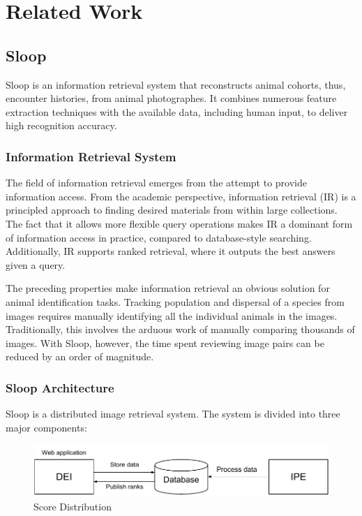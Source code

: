 \graphicspath{{./images/chap2/}}
\chapter{Related Work} %
\label{cha:related_work}

\section{Sloop}

Sloop is an information retrieval system that reconstructs animal cohorts, thus,
encounter histories, from animal photographes. It combines numerous feature
extraction techniques with the available data, including human input, to deliver
high recognition accuracy.

  \subsection{Information Retrieval System}

  The field of information retrieval emerges from the attempt to provide
  information access. From the academic perspective, information retrieval (IR)
  is a principled approach to finding desired materials
  from within large collections. The fact that it allows more flexible
  query operations makes IR a dominant form of information access in practice,
  compared to database-style searching. Additionally, IR supports ranked
  retrieval, where it outputs the best answers given a query.

  The preceding properties make information retrieval an obvious solution for
  animal identification tasks. Tracking population and dispersal of a species from
  images requires manually identifying all the individual animals in the images.
  Traditionally, this involves the arduous work of manually comparing thousands
  of images. With Sloop, however, the time spent reviewing image pairs can be
  reduced by an order of magnitude.

  \subsection{Sloop Architecture} Sloop is a distributed image retrieval system.
  The system is divided into three major components:

  \begin{figure}[htb]
    \centering
    \includegraphics[width=\textwidth]{sloop/system}
    \caption{Score Distribution}
    \label{fig:sloop_overview} %
  \end{figure}

